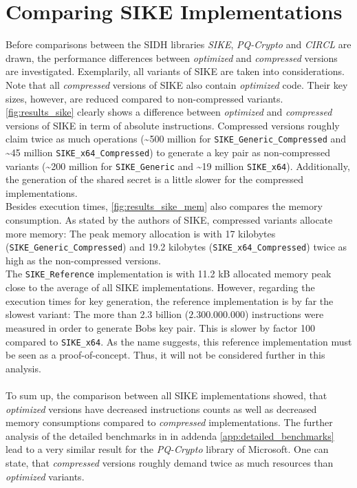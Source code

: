 \section{Comparing SIKE Implementations}\label{sec:analysis_sike}
Before comparisons between the SIDH libraries \textit{SIKE}, \textit{PQ-Crypto} and \textit{CIRCL} are drawn, the performance differences between \textit{optimized} and \textit{compressed} versions are investigated. Exemplarily, all variants of SIKE are taken into considerations. Note that all \textit{compressed} versions of SIKE also contain \textit{optimized} code. Their key sizes, however, are reduced compared to non-compressed variants.
\\
\autoref{fig:results_sike} clearly shows a difference between \textit{optimized} and \textit{compressed} versions of SIKE in term of absolute instructions. Compressed versions roughly claim twice as much operations (\textasciitilde 500 million for \texttt{SIKE\_Generic\_Compressed} and \textasciitilde 45 million \texttt{SIKE\_x64\_Compressed}) to generate a key pair as non-compressed variants (\textasciitilde 200 million for \texttt{SIKE\_Generic} and \textasciitilde 19 million \texttt{SIKE\_x64}). Additionally, the generation of the shared secret is a little slower for the compressed implementations.\\
Besides execution times, \autoref{fig:results_sike_mem} also compares the memory consumption. As stated by the authors of SIKE, compressed variants allocate more memory: The peak memory allocation is with 17 kilobytes (\texttt{SIKE\_Generic\_Compressed}) and 19.2 kilobytes (\texttt{SIKE\_x64\_Compressed}) twice as high as the non-compressed versions.\\
The \texttt{SIKE\_Reference} implementation is with 11.2 kB allocated memory peak close to the average of all SIKE implementations. However, regarding the execution times for key generation, the reference implementation is by far the slowest variant: The more than 2.3 billion ($2.300.000.000$) instructions were measured in order to generate Bobs key pair. This is slower by factor 100 compared to \texttt{SIKE\_x64}. As the name suggests, this reference implementation must be seen as a proof-of-concept. Thus, it will not be considered further in this analysis.
\\\\
To sum up, the comparison between all SIKE implementations showed, that \textit{optimized} versions have decreased instructions counts as well as decreased memory consumptions compared to \textit{compressed} implementations. The further analysis of the detailed benchmarks in in addenda \ref{app:detailed_benchmarks} lead to a very similar result for the \textit{PQ-Crypto} library of Microsoft.
One can state, that \textit{compressed} versions roughly demand twice as much resources than \textit{optimized} variants.

